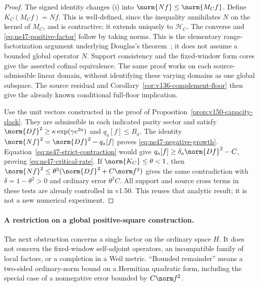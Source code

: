 \begin{proof}
The signed identity changes (i) into $\norm{Nf}\le\norm{M_Cf}$.
Define $K_C(M_Cf)=Nf$. This is well-defined, since the inequality
annihilates $N$ on the kernel of $M_C$, and is contractive; it extends
uniquely to $\mathcal H_C$. The converse and
\eqref{eq:ns47-positive-factor} follow by taking norms. This is the
elementary range-factorization argument underlying Douglas's
theorem~\cite{Douglas}; it does not assume a bounded global
operator $N$. Support consistency and the fixed-window form cores
give the asserted cofinal equivalence. The same proof works on each
source-admissible linear domain, without identifying these varying
domains as one global subspace. The source residual and
Corollary~\ref{cor:v136-complement-floor} then give the already known
conditional full-floor implication.

Use the unit vectors constructed in the proof of
Proposition~\ref{prop:v150-capacity-slack}. They are admissible in
each indicated parity sector and satisfy
$\norm{Df}^2\ge\kappa\exp(\gamma e^{2a})$ and $q_a[f]\le B_a$.
The identity $\norm{Nf}^2=\norm{Df}^2-q_a[f]$ proves
\eqref{eq:ns47-negative-growth}.
Equation~\eqref{eq:ns47-strict-contraction} would give
$q_a[f]\ge\delta_a\norm{Df}^2-C$, proving
\eqref{eq:ns47-critical-rate}. If $\norm{K_C}\le\theta<1$,
then $\norm{Nf}^2\le\theta^2(\norm{Df}^2+C\norm f^2)$ gives
the same contradiction with $\delta=1-\theta^2>0$ and ordinary
error $\theta^2C$. All support and source cross terms in these tests
are already controlled in v1.50. This reuses that analytic result;
it is not a new numerical experiment.
\end{proof}

\paragraph{A restriction on a global positive-square construction.}
The next obstruction concerns a single factor on the ordinary space
$H$. It does not concern the fixed-window self-adjoint operators,
an incompatible family of local factors, or a completion in a Weil
metric. ``Bounded remainder'' means a two-sided ordinary-norm bound
on a Hermitian quadratic form, including the special case of a
nonnegative error bounded by $C\norm f^2$.

